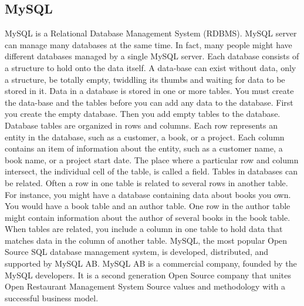 \subsection{MySQL}
MySQL is a Relational Database Management System (RDBMS). MySQL server can manage many
databases at the same time. In fact, many people might have different databases managed by a single
MySQL server. Each database consists of a structure to hold onto the data itself. A data-base can
exist without data, only a structure, be totally empty, twiddling its thumbs and waiting for data to be
stored in it. Data in a database is stored in one or more tables. You must create the data-base and
the tables before you can add any data to the database. First you create the empty database. Then
you add empty tables to the database. Database tables are organized in rows and columns. Each row
represents an entity in the database, such as a customer, a book, or a project. Each column contains
an item of information about the entity, such as a customer name, a book name, or a project start date.
The place where a particular row and column intersect, the individual cell of the table, is called a
field. Tables in databases can be related. Often a row in one table is related to several rows in another
table. For instance, you might have a database containing data about books you own. You would have
a book table and an author table. One row in the author table might contain information about the
author of several books in the book table. When tables are related, you include a column in one table
to hold data that matches data in the column of another table.
MySQL, the most popular Open Source SQL database management system, is developed, distributed, and supported by MySQL AB. MySQL 
AB is a commercial company, founded by the
MySQL developers. It is a second generation Open Source company that unites Open Restaurant
Management System Source values and methodology with a successful business model.
